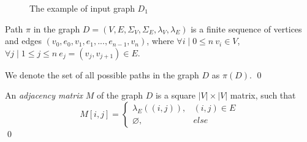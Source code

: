 \begin{figure}[h]
    \centering        
    \caption{The example of input graph $D_1$}
    \label{fig:example_input_graph}
\end{figure}

\begin{definition}
Path $\pi$ in the graph $D=(V, E, \Sigma_V, \Sigma_E, \lambda_V, \lambda_E)$ is a finite sequence of vertices and edges $(v_0, e_0, v_1, e_1, ..., e_{n-1}, v_{n})$, where $\forall i \mid 0 \leq n ~ v_i \in V$, $\forall j \mid 1 \leq j \leq n ~ e_j=(v_j, v_{j+1}) \in E$.

We denote the set of all possible paths in the graph $D$ as $\pi(D)$. \qed 
\end{definition}

\begin{definition}
An \emph{adjacency matrix} $M$ of the graph $D$ is a square $|V|\times|V|$ matrix, such that 
\begin{equation*}
M[i,j] =
 \begin{cases}
   \lambda_E((i, j)), & (i, j) \in E\\
   \varnothing, & else
 \end{cases}
\end{equation*} \qed
\end{definition}

